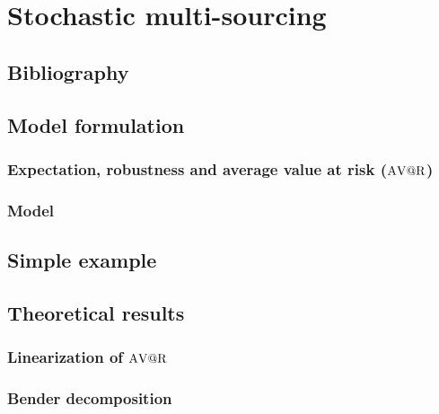 \chapter{Stochastic multi-sourcing}


\section{Bibliography}


\section{Model formulation}

\subsection{Expectation, robustness and average value at risk ($\mathrm{A\mathrm{V@R}}$)}


\subsection{Model}


\section{Simple example}


\section{Theoretical results}

\subsection{Linearization of $\mathrm{A\mathrm{V@R}}$}

\subsection{Bender decomposition}



